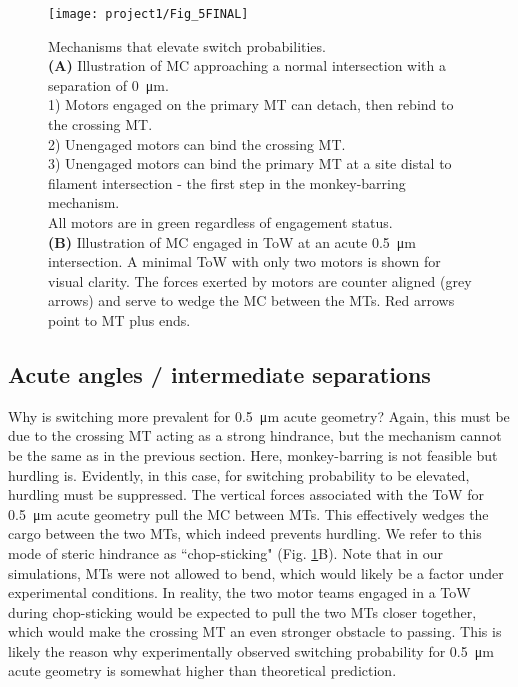 \begin{figure}
\centering
\texttt{[image: project1/Fig\_5FINAL]}
\caption[Mechanisms that elevate switch probabilities]{Mechanisms that elevate switch probabilities.\\
\textbf{(A)} Illustration of MC approaching a normal intersection with a separation of \SI{0}{\micro\meter}. \\1) Motors engaged on the primary MT can detach, then rebind to the crossing MT. \\2) Unengaged motors can bind the crossing MT. \\3) Unengaged motors can bind the primary MT at a site distal to filament intersection - the first step in the monkey-barring mechanism. \\All motors are in green regardless of engagement status.\\
\textbf{(B)} Illustration of MC engaged in ToW at an acute \SI{.5}{\micro\meter} intersection. A minimal ToW with only two motors is shown for visual clarity. The forces exerted by motors are counter aligned (grey arrows) and serve to wedge the MC between the MTs. Red arrows point to MT plus ends.}
\label{fig:5}
\end{figure}

\subsection{Acute angles / intermediate separations}

Why is switching more prevalent for \SI{.5}{\micro\meter} acute geometry? Again, this must be due to the crossing MT acting as a strong hindrance, but the mechanism cannot be the same as in the previous section. Here, monkey-barring is not feasible but hurdling is. Evidently, in this case, for switching probability to be elevated, hurdling must be suppressed. The vertical forces associated with the ToW for \SI{.5}{\micro\meter} acute geometry pull the MC between MTs. This effectively wedges the cargo between the two MTs, which indeed prevents hurdling. We refer to this mode of steric hindrance as ``chop-sticking" (Fig. \ref{fig:5}B). Note that in our simulations, MTs were not allowed to bend, which would likely be a factor under experimental conditions. In reality, the two motor teams engaged in a ToW during chop-sticking would be expected to pull the two MTs closer together, which would make the crossing MT an even stronger obstacle to passing. This is likely the reason why experimentally observed switching probability for \SI{.5}{\micro\meter} acute geometry is somewhat higher than theoretical prediction.


